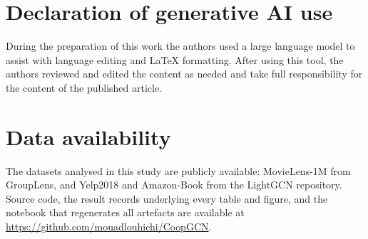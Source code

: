 \documentclass[final,5p,times,twocolumn]{elsarticle}
\begin{document}
\section*{Declaration of generative AI use}

During the preparation of this work the authors used a large language model to
assist with language editing and LaTeX formatting. After using this tool, the
authors reviewed and edited the content as needed and take full responsibility
for the content of the published article.

\section*{Data availability}

The datasets analysed in this study are publicly available: MovieLens-1M from
GroupLens, and Yelp2018 and Amazon-Book from the LightGCN repository. Source
code, the result records underlying every table and figure, and the notebook
that regenerates all artefacts are available at
\url{https://github.com/mouadlouhichi/CoopGCN}.



\end{document}

